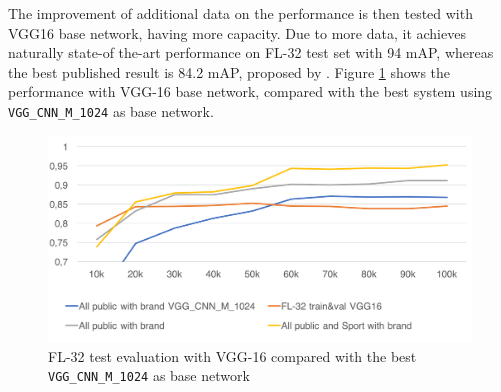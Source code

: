 The improvement of additional data on the performance is then tested with VGG16 base network, having more capacity. Due to more data, it achieves naturally state-of the-art performance on FL-32 test set with 94 mAP, whereas the best published result is 84.2 mAP, proposed by \cite{Bao:2016:RCL:3007669.3007728}. Figure \ref{f:vgg16fltest} shows the performance with VGG-16 base network, compared with the best system using \texttt{VGG\_CNN\_M\_1024} as base network.

\begin{figure}
  \centering
  \includegraphics[width=120mm]{images/mt/vgg16fltest.png}
  \caption{FL-32 test evaluation with VGG-16 compared with the best \texttt{VGG\_CNN\_M\_1024} as base network}
  \label{f:vgg16fltest}
\end{figure}